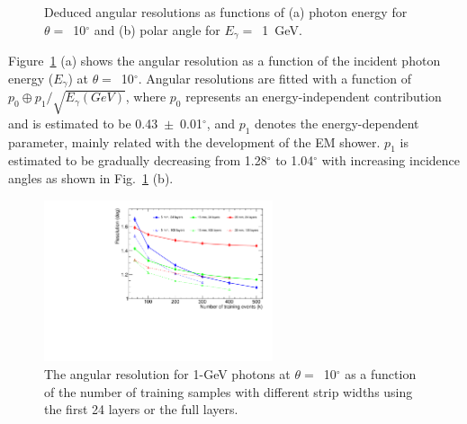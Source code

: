 \documentclass[preprint,12pt,times,a4paper]{elsarticle}
\begin{document}
\begin{figure}[!hbt]
\centering
{}
\caption{ Deduced angular resolutions as functions of (a) photon energy for $\theta=$~10$^{\circ}$ and (b) polar angle for $E_{\gamma}=$~1~GeV. }
\label{fig:angle_reco_dep_gr}
\end{figure}

Figure~\ref{fig:angle_reco_dep_gr} (a) shows the angular resolution as a function of the incident photon energy ($E_{\gamma}$) at $\theta=$~10$^{\circ}$. Angular resolutions are fitted with a function of $p_{0} \oplus p_{1}/\sqrt{E_{\gamma}(GeV)}$, where $p_{0}$ represents an energy-independent contribution and is estimated to be 0.43~$\pm$~0.01$^{\circ}$, and $p_{1}$ denotes the energy-dependent parameter, mainly related with the development of the EM shower. $p_{1}$ is estimated to be gradually decreasing from 1.28$^{\circ}$ to 1.04$^{\circ}$ with increasing incidence angles as shown in Fig.~\ref{fig:angle_reco_dep_gr} (b).

\begin{figure}[!hbt]
\centering
\includegraphics[width=0.6\textwidth]{figures/Fig8_nsample.pdf}
\caption{ The angular resolution for 1-GeV photons at $\theta=$~10$^{\circ}$ as a function of the number of training samples with different strip widths using the first 24 layers or the full layers. }
\label{fig:multi-parameter}
\end{figure}
\end{document}

